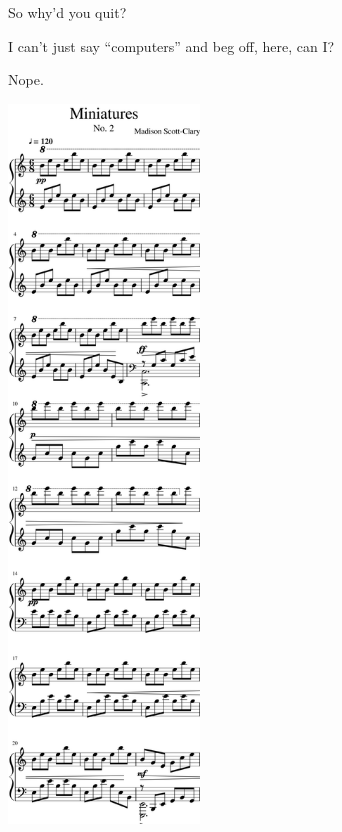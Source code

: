 \begin{paracol}{2}
\begin{leftcolumn}
\begin{ally}
So why'd you quit?
\end{ally}
I can't just say ``computers'' and beg off, here, can I?

\begin{ally}
Nope.
\end{ally}
\newpage
\end{leftcolumn}
\begin{rightcolumn*}
\noindent\includegraphics[width=2in]{assets/static/miniatures/2-1.png}


\end{rightcolumn*}
\end{paracol}
